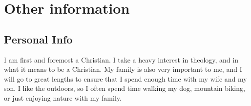 \documentclass[a4paper]{twentysecondcv} %
\begin{document}

\section{Other information}

\subsection{Personal Info}

I am first and foremost a Christian. I take a heavy interest in theology, and in what it means to be a Christian.
My family is also very important to me, and I will go to great lengths to ensure that I spend enough time with my wife and my son.
I like the outdoors, so I often spend time walking my dog, mountain biking, or just enjoying nature with my family.






\end{document}
